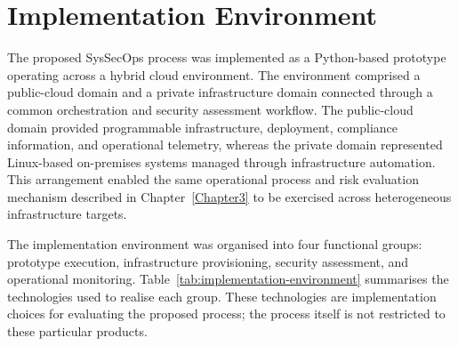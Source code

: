 \section{Implementation Environment}
\label{sec:implementation-environment}

The proposed SysSecOps process was implemented as a Python-based prototype operating
across a hybrid cloud environment. The environment comprised a public-cloud domain and
a private infrastructure domain connected through a common orchestration and security
assessment workflow. The public-cloud domain provided programmable infrastructure,
deployment, compliance information, and operational telemetry, whereas the private
domain represented Linux-based on-premises systems managed through infrastructure
automation. This arrangement enabled the same operational process and risk evaluation
mechanism described in Chapter~\ref{Chapter3} to be exercised across heterogeneous
infrastructure targets.

The implementation environment was organised into four functional groups: prototype
execution, infrastructure provisioning, security assessment, and operational
monitoring. Table~\ref{tab:implementation-environment} summarises the technologies used
to realise each group. These technologies are implementation choices for evaluating the
proposed process; the process itself is not restricted to these particular products.


